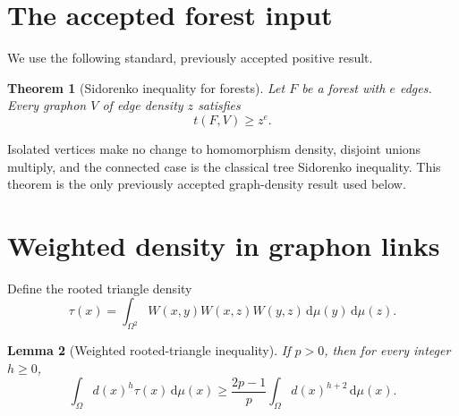 \documentclass[11pt]{article}
\newtheorem{theorem}{Theorem}[section]
\newtheorem{lemma}[theorem]{Lemma}
\newcommand{\dd}{\,\mathrm{d}}
\begin{document}
\section{The accepted forest input}

We use the following standard, previously accepted positive result.

\begin{theorem}[Sidorenko inequality for forests]
\label{thm:forest-sidorenko}
Let $F$ be a forest with $e$ edges.  Every graphon $V$ of edge density
$z$ satisfies
\[
t(F,V)\geq z^e.
\]
\end{theorem}

Isolated vertices make no change to homomorphism density, disjoint
unions multiply, and the connected case is the classical tree
Sidorenko inequality.  This theorem is the only previously accepted
graph-density result used below.


\section{Weighted density in graphon links}

Define the rooted triangle density
\[
\tau(x)
=
\int_{\Omega^2}
W(x,y)W(x,z)W(y,z)
\dd\mu(y)\dd\mu(z).
\]

\begin{lemma}[Weighted rooted-triangle inequality]
\label{lem:weighted-triangle}
If $p>0$, then for every integer $h\geq0$,
\[
\int_\Omega d(x)^h\tau(x)\dd\mu(x)
\geq
\frac{2p-1}{p}
\int_\Omega d(x)^{h+2}\dd\mu(x).
\]
\end{lemma}
\end{document}
